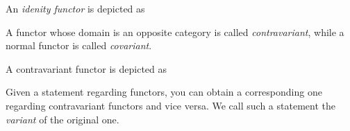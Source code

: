 \begin{definition}
An \emph{idenity functor}
is depicted as
\end{definition}


\begin{definition}
A functor whose domain is an opposite category
is called \emph{contravariant}, while a normal functor is called \emph{covariant}.
\end{definition}
A contravariant functor is depicted as

\begin{definition}[Variant]
Given a statement regarding functors, you can obtain a corresponding one regarding contravariant functors and vice versa. %
We call such a statement the \emph{variant} of the original one.
\end{definition}


